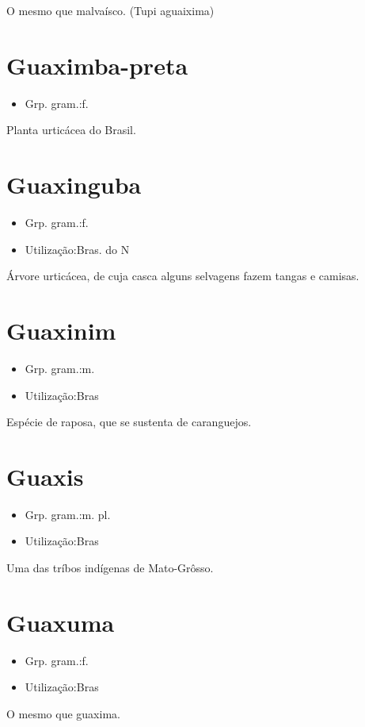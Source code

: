 O mesmo que \textunderscore malvaísco\textunderscore .
(Tupi \textunderscore aguaixima\textunderscore )
\section{Guaximba-preta}
\begin{itemize}
\item {Grp. gram.:f.}
\end{itemize}
Planta urticácea do Brasil.
\section{Guaxinguba}
\begin{itemize}
\item {Grp. gram.:f.}
\end{itemize}
\begin{itemize}
\item {Utilização:Bras. do N}
\end{itemize}
Árvore urticácea, de cuja casca alguns selvagens fazem tangas e camisas.
\section{Guaxinim}
\begin{itemize}
\item {Grp. gram.:m.}
\end{itemize}
\begin{itemize}
\item {Utilização:Bras}
\end{itemize}
Espécie de raposa, que se sustenta de caranguejos.
\section{Guaxis}
\begin{itemize}
\item {Grp. gram.:m. pl.}
\end{itemize}
\begin{itemize}
\item {Utilização:Bras}
\end{itemize}
Uma das tríbos indígenas de Mato-Grôsso.
\section{Guaxuma}
\begin{itemize}
\item {Grp. gram.:f.}
\end{itemize}
\begin{itemize}
\item {Utilização:Bras}
\end{itemize}
O mesmo que \textunderscore guaxima\textunderscore .
